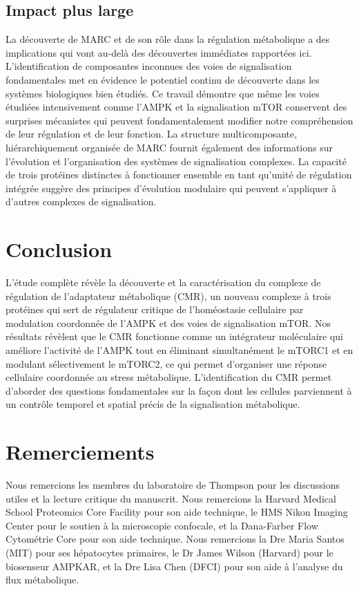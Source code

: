 \documentclass[11pt,a4paper]{article}
\begin{document}
\subsection{Impact plus large}

La découverte de MARC et de son rôle dans la régulation métabolique a des implications qui vont au-delà des découvertes immédiates rapportées ici. L'identification de composantes inconnues des voies de signalisation fondamentales met en évidence le potentiel continu de découverte dans les systèmes biologiques bien étudiés. Ce travail démontre que même les voies étudiées intensivement comme l'AMPK et la signalisation mTOR conservent des surprises mécanistes qui peuvent fondamentalement modifier notre compréhension de leur régulation et de leur fonction. La structure multicomposante, hiérarchiquement organisée de MARC fournit également des informations sur l'évolution et l'organisation des systèmes de signalisation complexes. La capacité de trois protéines distinctes à fonctionner ensemble en tant qu'unité de régulation intégrée suggère des principes d'évolution modulaire qui peuvent s'appliquer à d'autres complexes de signalisation.

\section{Conclusion}

L'étude complète révèle la découverte et la caractérisation du complexe de régulation de l'adaptateur métabolique (CMR), un nouveau complexe à trois protéines qui sert de régulateur critique de l'homéostasie cellulaire par modulation coordonnée de l'AMPK et des voies de signalisation mTOR. Nos résultats révèlent que le CMR fonctionne comme un intégrateur moléculaire qui améliore l'activité de l'AMPK tout en éliminant simultanément le mTORC1 et en modulant sélectivement le mTORC2, ce qui permet d'organiser une réponse cellulaire coordonnée au stress métabolique. L'identification du CMR permet d'aborder des questions fondamentales sur la façon dont les cellules parviennent à un contrôle temporel et spatial précis de la signalisation métabolique.

\section*{Remerciements}

Nous remercions les membres du laboratoire de Thompson pour les discussions utiles et la lecture critique du manuscrit. Nous remercions la Harvard Medical School Proteomics Core Facility pour son aide technique, le HMS Nikon Imaging Center pour le soutien à la microscopie confocale, et la Dana-Farber Flow Cytométrie Core pour son aide technique. Nous remercions la Dre Maria Santos (MIT) pour ses hépatocytes primaires, le Dr James Wilson (Harvard) pour le biosenseur AMPKAR, et la Dre Lisa Chen (DFCI) pour son aide à l'analyse du flux métabolique.
\end{document}
